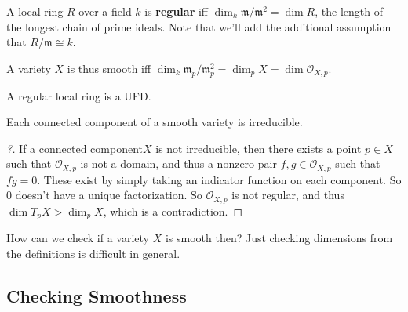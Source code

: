 \begin{definition}

A local ring \(R\) over a field \(k\) is \textbf{regular} iff
\(\dim_k \mathfrak{m}/\mathfrak{m}^2 = \dim R\), the length of the
longest chain of prime ideals. Note that we'll add the additional
assumption that \(R/\mathfrak{m} \cong k\).

\end{definition}

\begin{remark}

A variety \(X\) is thus smooth iff
\(\dim_k \mathfrak{m}_p / \mathfrak{m}_p^2 = \dim_p X = \dim {\mathcal{O}}_{X, p}\).

\end{remark}

\begin{theorem}

A regular local ring is a UFD.

\end{theorem}

\begin{corollary}[?]

Each connected component of a smooth variety is irreducible.

\end{corollary}

\begin{proof}[?]

If a connected component\(X\) is not irreducible, then there exists a
point \(p\in X\) such that \({\mathcal{O}}_{X, p}\) is not a domain, and
thus a nonzero pair \(f, g \in {\mathcal{O}}_{X, p}\) such that
\(fg=0\). These exist by simply taking an indicator function on each
component. So \(0\) doesn't have a unique factorization. So
\({\mathcal{O}}_{X, p}\) is not regular, and thus
\(\dim T_p X > \dim_p X\), which is a contradiction.

\end{proof}

\begin{remark}

How can we check if a variety \(X\) is smooth then? Just checking
dimensions from the definitions is difficult in general.

\end{remark}

\hypertarget{checking-smoothness}{%
\subsection{Checking Smoothness}\label{checking-smoothness}}

